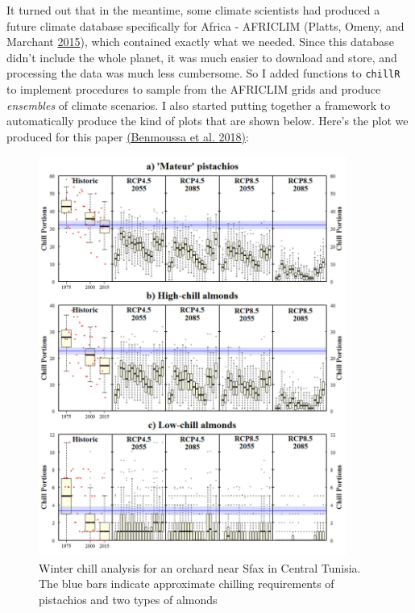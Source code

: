 \documentclass[
]{book}
\begin{document}
It turned out that in the meantime, some climate scientists had produced a future climate database specifically for Africa - AFRICLIM (Platts, Omeny, and Marchant \protect\hyperlink{ref-platts2015africlim}{2015}), which contained exactly what we needed. Since this database didn't include the whole planet, it was much easier to download and store, and processing the data was much less cumbersome. So I added functions to \texttt{chillR} to implement procedures to sample from the AFRICLIM grids and produce \emph{ensembles} of climate scenarios. I also started putting together a framework to automatically produce the kind of plots that are shown below. Here's the plot we produced for this paper \href{https://link.springer.com/article/10.1007/s00484-018-1628-x}{(Benmoussa et al. \protect\hyperlink{ref-benmoussa2018climate}{2018})}:

\begin{figure}
\centering
\includegraphics[width=0.9\textwidth,height=\textheight]{pictures/Tunisia_2018_Fig_1.jpg}
\caption{Winter chill analysis for an orchard near Sfax in Central Tunisia. The blue bars indicate approximate chilling requirements of pistachios and two types of almonds}
\end{figure}
\end{document}
